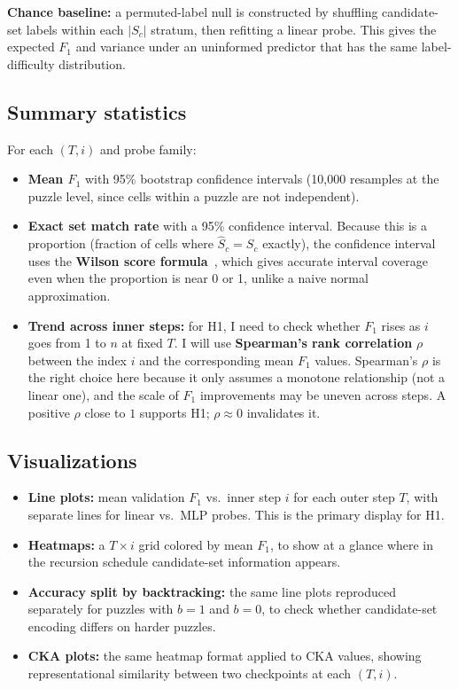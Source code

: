 \documentclass{article}
\begin{document}
\textbf{Chance baseline:} a permuted-label null is constructed by shuffling candidate-set labels within each $|S_c|$ stratum, then refitting a linear probe.  This gives the expected $F_1$ and variance under an uninformed predictor that has the same label-difficulty distribution.

\subsection{Summary statistics}

For each $(T,i)$ and probe family:
\begin{itemize}[nosep]
    \item \textbf{Mean $F_1$} with 95\% bootstrap confidence intervals (10{,}000 resamples at the puzzle level, since cells within a puzzle are not independent).
    \item \textbf{Exact set match rate} with a 95\% confidence interval.  Because this is a proportion (fraction of cells where $\hat{S}_c = S_c$ exactly), the confidence interval uses the \textbf{Wilson score formula}~\cite{wilson1927}, which gives accurate interval coverage even when the proportion is near 0 or 1, unlike a naive normal approximation.
    \item \textbf{Trend across inner steps:} for H1, I need to check whether $F_1$ rises as $i$ goes from 1 to $n$ at fixed $T$.  I will use \textbf{Spearman's rank correlation} $\rho$ between the index $i$ and the corresponding mean $F_1$ values.  Spearman's $\rho$ is the right choice here because it only assumes a monotone relationship (not a linear one), and the scale of $F_1$ improvements may be uneven across steps.  A positive $\rho$ close to $1$ supports H1; $\rho \approx 0$ invalidates it.
\end{itemize}

\subsection{Visualizations}

\begin{itemize}[nosep]
    \item \textbf{Line plots:} mean validation $F_1$ vs.\ inner step $i$ for each outer step $T$, with separate lines for linear vs.\ MLP probes.  This is the primary display for H1.
    \item \textbf{Heatmaps:} a $T \times i$ grid colored by mean $F_1$, to show at a glance where in the recursion schedule candidate-set information appears.
    \item \textbf{Accuracy split by backtracking:} the same line plots reproduced separately for puzzles with $b=1$ and $b=0$, to check whether candidate-set encoding differs on harder puzzles.
    \item \textbf{CKA plots:} the same heatmap format applied to CKA values, showing representational similarity between two checkpoints at each $(T,i)$.
\end{itemize}
\end{document}
